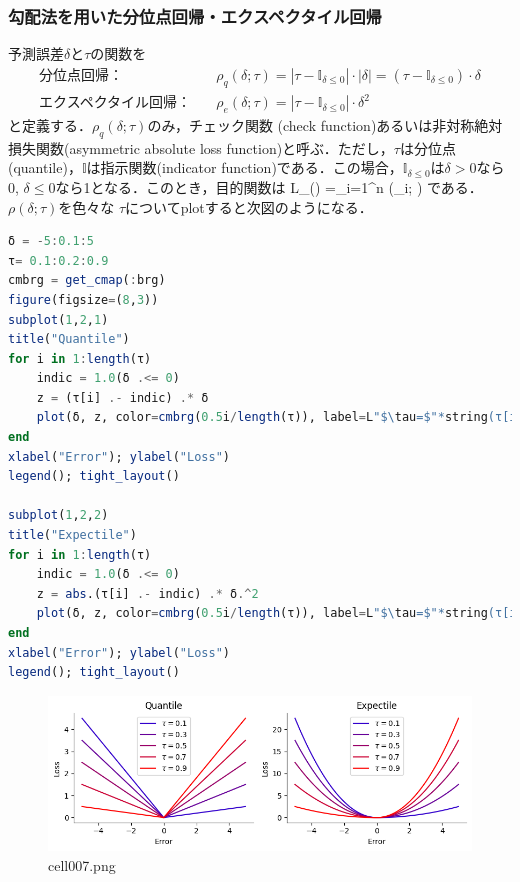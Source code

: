 \subsubsection{勾配法を用いた分位点回帰・エクスペクタイル回帰}
予測誤差$\delta$と$\tau$の関数を
\begin{align}
\text{分位点回帰：}&\quad
\rho_q(\delta; \tau)=\left|\tau-\mathbb{I}_{\delta \leq 0}\right|\cdot |\delta|=\left(\tau-\mathbb{I}_{\delta \leq 0}\right)\cdot \delta\\
\text{エクスペクタイル回帰：}&\quad
\rho_e(\delta; \tau)=\left|\tau-\mathbb{I}_{\delta \leq 0}\right|\cdot \delta^2
\end{align}
と定義する．$\rho_q(\delta; \tau)$のみ，チェック関数 (check function)あるいは非対称絶対損失関数(asymmetric absolute loss function)と呼ぶ．ただし，$\tau$は分位点(quantile)，$\mathbb{I}$は指示関数(indicator function)である．この場合，$\mathbb{I}_{\delta \leq 0}$は$\delta \gt 0$なら0, $\delta \leq 0$なら1となる．このとき，目的関数は 
L_{\tau}(\delta)
=\sum_{i=1}^n \rho(\delta_i; \tau)
である．$\rho(\delta; \tau)$を色々な $\tau$についてplotすると次図のようになる．
\begin{lstlisting}[language=julia]
δ = -5:0.1:5
τ= 0.1:0.2:0.9
cmbrg = get_cmap(:brg) 
figure(figsize=(8,3))
subplot(1,2,1)
title("Quantile")
for i in 1:length(τ)
    indic = 1.0(δ .<= 0)
    z = (τ[i] .- indic) .* δ
    plot(δ, z, color=cmbrg(0.5i/length(τ)), label=L"$\tau=$"*string(τ[i]))
end
xlabel("Error"); ylabel("Loss")
legend(); tight_layout()

subplot(1,2,2)
title("Expectile")
for i in 1:length(τ)
    indic = 1.0(δ .<= 0)
    z = abs.(τ[i] .- indic) .* δ.^2
    plot(δ, z, color=cmbrg(0.5i/length(τ)), label=L"$\tau=$"*string(τ[i]))
end
xlabel("Error"); ylabel("Loss")
legend(); tight_layout()
\end{lstlisting}
\begin{figure}[ht]
	\centering
	\includegraphics[scale=0.8, max width=\linewidth]{./fig/bayesian-brain/quantile-expectile-regression/cell007.png}
	\caption{cell007.png}
	\label{cell007.png}
\end{figure}
